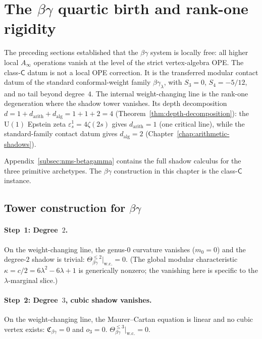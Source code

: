 \section{The \texorpdfstring{$\beta\gamma$}{beta-gamma} quartic birth and rank-one rigidity}
\label{sec:betagamma-quartic-birth}

The preceding sections established that the $\beta\gamma$ system is
locally free: all higher local $A_\infty$ operations vanish at the
level of the strict vertex-algebra OPE. The class-$\mathsf C$ datum is
not a local OPE correction. It is the transferred modular contact
datum of the standard conformal-weight family
$\beta\gamma_\lambda$, with $S_3=0$, $S_4=-5/12$, and no tail beyond
degree~$4$. The internal weight-changing line is the rank-one
degeneration where the shadow tower vanishes.
Its depth decomposition $d = 1 + d_{\mathrm{arith}} + d_{\mathrm{alg}}
= 1 + 1 + 2 = 4$
(Theorem~\ref{thm:depth-decomposition}): the $\mathrm{U}(1)$
Epstein zeta $\varepsilon^1_s = 4\zeta(2s)$ gives
$d_{\mathrm{arith}} = 1$ (one critical line), while the
standard-family contact datum gives $d_{\mathrm{alg}} = 2$
(Chapter~\ref{chap:arithmetic-shadows}).

Appendix~\ref{subsec:nms-betagamma} contains the full shadow calculus
for the three primitive archetypes. The $\beta\gamma$ construction in
this chapter is the class-$\mathsf C$ instance.

\subsection{Tower construction for \texorpdfstring{$\beta\gamma$}{beta-gamma}}
\label{subsec:betagamma-tower-construction}

\paragraph{Step~1: Degree~$2$.}
On the weight-changing line, the genus-$0$ curvature vanishes ($m_0 = 0$) and the
degree-$2$ shadow is trivial:
$\Theta_{\beta\gamma}^{\leq 2}\big|_{\text{w.c.}} = 0$.
(The global modular characteristic $\kappa = c/2 = 6\lambda^2 - 6\lambda + 1$
is generically nonzero; the vanishing here is specific to the
$\lambda$-marginal slice.)

\paragraph{Step~2: Degree~$3$, cubic shadow vanishes.}
On the weight-changing line, the Maurer--Cartan equation is linear
and no cubic vertex exists:
$\mathfrak{C}_{\beta\gamma} = 0$ and $o_3 = 0$.
$\Theta_{\beta\gamma}^{\leq 3}|_{\mathrm{w.c.}} = 0$.

